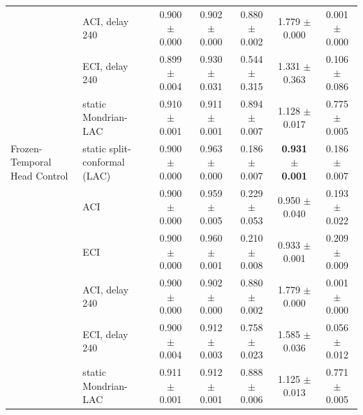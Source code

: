 \begin{table}[t]
{\begin{tabular}{llccccc}
 & ACI, delay 240 & 0.900 $\pm$ 0.000 & 0.902 $\pm$ 0.000 & 0.880 $\pm$ 0.002 & 1.779 $\pm$ 0.000 & 0.001 $\pm$ 0.000 \\
 & ECI, delay 240 & 0.899 $\pm$ 0.004 & 0.930 $\pm$ 0.031 & 0.544 $\pm$ 0.315 & 1.331 $\pm$ 0.363 & 0.106 $\pm$ 0.086 \\
 & static Mondrian-LAC & 0.910 $\pm$ 0.001 & 0.911 $\pm$ 0.001 & 0.894 $\pm$ 0.007 & 1.128 $\pm$ 0.017 & 0.775 $\pm$ 0.005 \\
\midrule
Frozen-Temporal Head Control & static split-conformal (LAC) & 0.900 $\pm$ 0.000 & 0.963 $\pm$ 0.000 & 0.186 $\pm$ 0.007 & \textbf{0.931 $\pm$ 0.001} & 0.186 $\pm$ 0.007 \\
 & ACI & 0.900 $\pm$ 0.000 & 0.959 $\pm$ 0.005 & 0.229 $\pm$ 0.053 & 0.950 $\pm$ 0.040 & 0.193 $\pm$ 0.022 \\
 & ECI & 0.900 $\pm$ 0.000 & 0.960 $\pm$ 0.001 & 0.210 $\pm$ 0.008 & 0.933 $\pm$ 0.001 & 0.209 $\pm$ 0.009 \\
 & ACI, delay 240 & 0.900 $\pm$ 0.000 & 0.902 $\pm$ 0.000 & 0.880 $\pm$ 0.002 & 1.779 $\pm$ 0.000 & 0.001 $\pm$ 0.000 \\
 & ECI, delay 240 & 0.900 $\pm$ 0.004 & 0.912 $\pm$ 0.003 & 0.758 $\pm$ 0.023 & 1.585 $\pm$ 0.036 & 0.056 $\pm$ 0.012 \\
 & static Mondrian-LAC & 0.911 $\pm$ 0.001 & 0.912 $\pm$ 0.001 & 0.888 $\pm$ 0.006 & 1.125 $\pm$ 0.013 & 0.771 $\pm$ 0.005 \\
\bottomrule
\end{tabular}%
}
\end{table}
